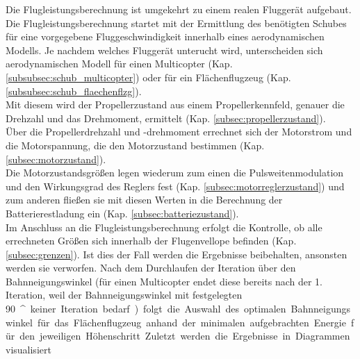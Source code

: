 Die Flugleistungsberechnung ist umgekehrt zu einem realen Fluggerät aufgebaut.
Die Flugleistungsberechnung startet mit der Ermittlung des benötigten Schubes für eine vorgegebene Fluggeschwindigkeit innerhalb eines aerodynamischen Modells. Je nachdem welches Fluggerät unterucht wird, unterscheiden sich aerodynamischen Modell für einen Multicopter (Kap. \ref{subsubsec:schub_multicopter}) oder für ein Flächenflugzeug (Kap. \ref{subsubsec:schub_flaechenflzg}). \\
Mit diesem wird der Propellerzustand aus einem Propellerkennfeld, genauer die Drehzahl und das Drehmoment, ermittelt (Kap. \ref{subsec:propellerzustand}). \\
Über die Propellerdrehzahl und -drehmoment errechnet sich der Motorstrom und die Motorspannung, die den Motorzustand bestimmen (Kap. \ref{subsec:motorzustand}). \\
Die Motorzustandsgrößen legen wiederum zum einen die Pulsweitenmodulation und den Wirkungsgrad des Reglers fest (Kap. \ref{subsec:motorreglerzustand}) und zum anderen fließen sie mit diesen Werten in die Berechnung der Batterierestladung ein (Kap. \ref{subsec:batteriezustand}). \\
Im Anschluss an die Flugleistungsberechnung erfolgt die Kontrolle, ob alle errechneten Größen sich innerhalb der Flugenvellope befinden (Kap. \ref{subsec:grenzen}). Ist dies der Fall werden die Ergebnisse beibehalten, ansonsten werden sie verworfen. 
Nach dem Durchlaufen der Iteration über den Bahnneigungswinkel (für einen Multicopter endet diese bereits nach der 1. Iteration, weil der Bahnneigungswinkel mit festgelegten \SI{90}{^\circ} keiner Iteration bedarf) folgt die Auswahl des optimalen Bahnneigungswinkel für das Flächenflugzeug anhand der minimalen aufgebrachten Energie für den jeweiligen Höhenschritt.
Zuletzt werden die Ergebnisse in Diagrammen visualisiert.



